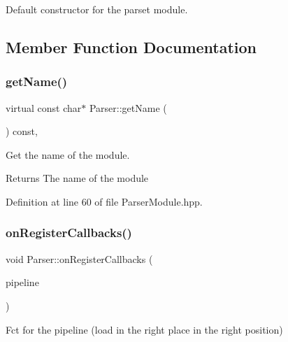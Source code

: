 Default constructor for the parset module. 



\subsection{Member Function Documentation}
\mbox{\label{class_parser_a655ca8534272a48ee94113695f6494fc}} 
\subsubsection{\texorpdfstring{get\+Name()}{getName()}}
{\footnotesize\ttfamily virtual const char$\ast$ Parser\+::get\+Name (\begin{DoxyParamCaption}\item[{void}]{ }\end{DoxyParamCaption}) const\hspace{0.3cm}{\ttfamily [inline]}, {\ttfamily [virtual]}}



Get the name of the module. 

\begin{DoxyReturn}{Returns}
The name of the module 
\end{DoxyReturn}


Definition at line 60 of file Parser\+Module.\+hpp.

\mbox{\label{class_parser_a0e8278ef45fabe33144c78c51fbfcf7d}} 
\subsubsection{\texorpdfstring{on\+Register\+Callbacks()}{onRegisterCallbacks()}}
{\footnotesize\ttfamily void Parser\+::on\+Register\+Callbacks (\begin{DoxyParamCaption}\item[{o\+Z\+::\+Pipeline \&}]{pipeline }\end{DoxyParamCaption})\hspace{0.3cm}{\ttfamily [virtual]}}



Fct for the pipeline (load in the right place in the right position) 


